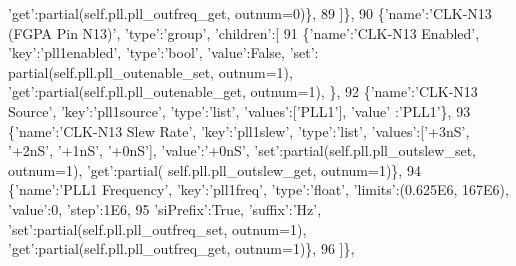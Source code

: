 \begin{DoxyCode}
{      'get'}:partial(self.pll.pll\_outfreq\_get, outnum=0)\},
89                 ]\},
90                 \{\textcolor{stringliteral}{'name'}:\textcolor{stringliteral}{'CLK-N13 (FGPA Pin N13)'}, \textcolor{stringliteral}{'type'}:\textcolor{stringliteral}{'group'}, \textcolor{stringliteral}{'children'}:[
91                     \{\textcolor{stringliteral}{'name'}:\textcolor{stringliteral}{'CLK-N13 Enabled'}, \textcolor{stringliteral}{'key'}:\textcolor{stringliteral}{'pll1enabled'}, \textcolor{stringliteral}{'type'}:\textcolor{stringliteral}{'bool'}, \textcolor{stringliteral}{'value'}:\textcolor{keyword}{False}, \textcolor{stringliteral}{'set'}:
      partial(self.pll.pll\_outenable\_set, outnum=1), \textcolor{stringliteral}{'get'}:partial(self.pll.pll\_outenable\_get, outnum=1), \},
92                     \{\textcolor{stringliteral}{'name'}:\textcolor{stringliteral}{'CLK-N13 Source'}, \textcolor{stringliteral}{'key'}:\textcolor{stringliteral}{'pll1source'}, \textcolor{stringliteral}{'type'}:\textcolor{stringliteral}{'list'}, \textcolor{stringliteral}{'values'}:[\textcolor{stringliteral}{'PLL1'}], \textcolor{stringliteral}{'value'}
      :\textcolor{stringliteral}{'PLL1'}\},
93                     \{\textcolor{stringliteral}{'name'}:\textcolor{stringliteral}{'CLK-N13 Slew Rate'}, \textcolor{stringliteral}{'key'}:\textcolor{stringliteral}{'pll1slew'}, \textcolor{stringliteral}{'type'}:\textcolor{stringliteral}{'list'}, \textcolor{stringliteral}{'values'}:[\textcolor{stringliteral}{'+3nS'}, \textcolor{stringliteral}{'+2nS'},
       \textcolor{stringliteral}{'+1nS'}, \textcolor{stringliteral}{'+0nS'}], \textcolor{stringliteral}{'value'}:\textcolor{stringliteral}{'+0nS'}, \textcolor{stringliteral}{'set'}:partial(self.pll.pll\_outslew\_set, outnum=1), \textcolor{stringliteral}{'get'}:partial(
      self.pll.pll\_outslew\_get, outnum=1)\},
94                     \{\textcolor{stringliteral}{'name'}:\textcolor{stringliteral}{'PLL1 Frequency'}, \textcolor{stringliteral}{'key'}:\textcolor{stringliteral}{'pll1freq'}, \textcolor{stringliteral}{'type'}:\textcolor{stringliteral}{'float'}, \textcolor{stringliteral}{'limits'}:(0.625E6, 167E6), \textcolor{stringliteral}{
      'value'}:0, \textcolor{stringliteral}{'step'}:1E6,
95                         \textcolor{stringliteral}{'siPrefix'}:\textcolor{keyword}{True}, \textcolor{stringliteral}{'suffix'}:\textcolor{stringliteral}{'Hz'}, \textcolor{stringliteral}{'set'}:partial(self.pll.pll\_outfreq\_set, outnum=1), \textcolor{stringliteral}{
      'get'}:partial(self.pll.pll\_outfreq\_get, outnum=1)\},
96                 ]\},

\end{DoxyCode}
